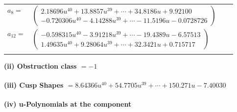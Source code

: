 \documentclass[1p]{elsarticle_modified}
\theoremstyle{definition}
\begin{document}
\begin{tabular}{m{7pt} m{180pt} m{7pt} m{180pt} }
\flushright $a_{8}=$&$\begin{pmatrix}2.18696 u^{40}+13.8857 u^{39}+\cdots+34.8186 u+9.92100\\-0.720306 u^{40}-4.14288 u^{39}+\cdots-11.5196 u-0.0728726\end{pmatrix}$ \\
\flushright $a_{12}=$&$\begin{pmatrix}-0.598315 u^{40}-3.91218 u^{39}+\cdots-19.4389 u-6.57513\\1.49635 u^{40}+9.28064 u^{39}+\cdots+32.3421 u+0.715717\end{pmatrix}$\\&\end{tabular}
\flushleft \textbf{(ii) Obstruction class $= -1$}\\~\\
\flushleft \textbf{(iii) Cusp Shapes $= 8.64366 u^{40}+54.7705 u^{39}+\cdots+150.271 u-7.40030$}\\~\\
\newpage\renewcommand{\arraystretch}{1}
\flushleft \textbf{(iv) u-Polynomials at the component}\newline \\
\end{document}
